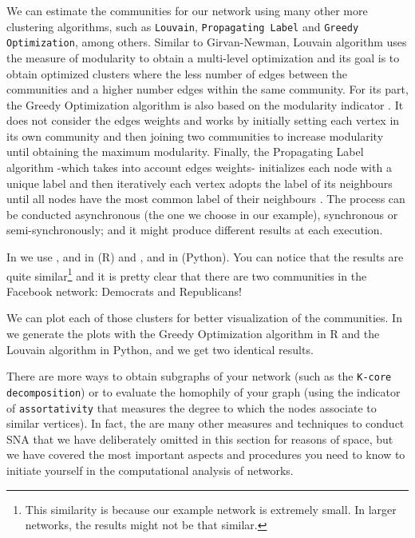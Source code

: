 We can estimate the communities for our network using many other more clustering algorithms, such as \texttt{Louvain}, \texttt{Propagating Label} and \texttt{Greedy Optimization}, among others. Similar to Girvan-Newman, Louvain algorithm uses the measure of modularity to obtain a multi-level optimization \citep{blondel2008fast} and its goal is to obtain optimized clusters where the less number of edges between the communities and a higher number edges within the same community. For its part, the Greedy Optimization algorithm is also based on the modularity indicator \citep{clauset2004finding}. It does not consider the edges weights and works by initially setting each vertex in its own community and then joining two communities to increase modularity until obtaining the maximum modularity. Finally, the Propagating Label algorithm -which takes into account edges weights- initializes each node with a unique label and then iteratively each vertex adopts the label of its neighbours until all nodes have the most common label of their neighbours \citep{raghavan2007near}. The process can be conducted asynchronous (the one we choose in our example), synchronous or semi-synchronously; and it might produce different results at each execution.

In  we use ,  and  in  (R) and ,  and  in  (Python). You can notice  that the results are quite similar\footnote{This similarity is because our example network is extremely small. In larger networks, the results might not be that similar.}  and it is pretty clear that there are two communities in the Facebook network: Democrats and Republicans!


We can plot each of those clusters for better visualization of the communities. In  we generate the plots with the Greedy Optimization algorithm in R and the Louvain algorithm in Python, and we get two identical results.


There are more ways to obtain subgraphs of your network (such as the \texttt{K-core decomposition}) or to evaluate the homophily of your graph (using the indicator of \texttt{assortativity} that measures the degree to which the nodes associate to similar vertices). In fact, the are many other measures and techniques to conduct SNA that we have deliberately omitted in this section for reasons of space, but we have covered the most important aspects and procedures you need to know to initiate yourself in the computational analysis of networks.
